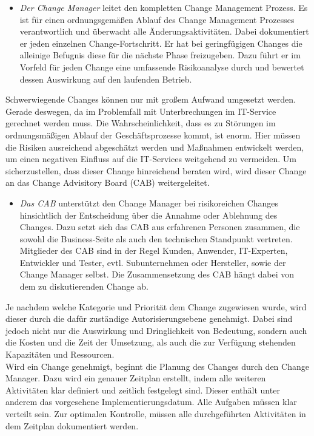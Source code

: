 \begin{itemize}
\vspace{-0.1cm}
	\item \textit{Der Change Manager} leitet den kompletten Change Management Prozess. Es ist für einen ordnungsgemäßen Ablauf des Change Management Prozesses verantwortlich und überwacht alle Änderungsaktivitäten. Dabei dokumentiert er jeden einzelnen Change-Fortschritt. Er hat bei geringfügigen Changes die alleinige Befugnis diese für die nächste Phase freizugeben. Dazu führt er im Vorfeld für jeden Change eine umfassende Risikoanalyse durch und bewertet dessen Auswirkung auf den laufenden Betrieb. 
\end{itemize}
\vspace{-0.1cm}
Schwerwiegende Changes können nur mit großem Aufwand umgesetzt werden. Gerade deswegen, da im Problemfall mit Unterbrechungen im IT-Service gerechnet werden muss. Die Wahrscheinlichkeit, dass es zu Störungen im ordnungsmäßigen Ablauf der Geschäftsprozesse kommt, ist enorm. Hier müssen die Risiken ausreichend abgeschätzt werden und Maßnahmen entwickelt werden, um einen negativen Einfluss auf die IT-Services weitgehend zu vermeiden. Um sicherzustellen, dass dieser Change hinreichend beraten wird, wird dieser Change an das Change Advisitory Board (CAB) weitergeleitet. 
\begin{itemize}
	\item \textit{Das CAB} unterstützt den Change Manager bei risikoreichen Changes hinsichtlich der Entscheidung über die Annahme oder Ablehnung des Changes. Dazu setzt sich das CAB aus erfahrenen Personen zusammen, die sowohl die Business-Seite als auch den technischen Standpunkt vertreten. Mitglieder des CAB sind in der Regel Kunden, Anwender, IT-Experten, Entwickler und Tester, evtl. Subunternehmen oder Hersteller, sowie der Change Manager selbst. Die Zusammensetzung des CAB hängt dabei von dem zu diskutierenden Change ab. 
\end{itemize}
Je nachdem welche Kategorie und Priorität dem Change zugewiesen wurde, wird dieser durch die dafür zuständige Autorisierungsebene genehmigt. Dabei sind jedoch nicht nur die Auswirkung und Dringlichkeit von Bedeutung, sondern auch die Kosten und die Zeit der Umsetzung, als auch die zur Verfügung stehenden Kapazitäten und Ressourcen. 
\\
Wird ein Change genehmigt, beginnt die Planung des Changes durch den Change Manager. Dazu wird ein genauer Zeitplan erstellt, indem alle weiteren Aktivitäten klar definiert und zeitlich festgelegt sind. Dieser enthält unter anderem das vorgesehene Implementierungsdatum. Alle Aufgaben müssen klar verteilt sein. Zur optimalen Kontrolle, müssen alle durchgeführten Aktivitäten in dem Zeitplan dokumentiert werden.
